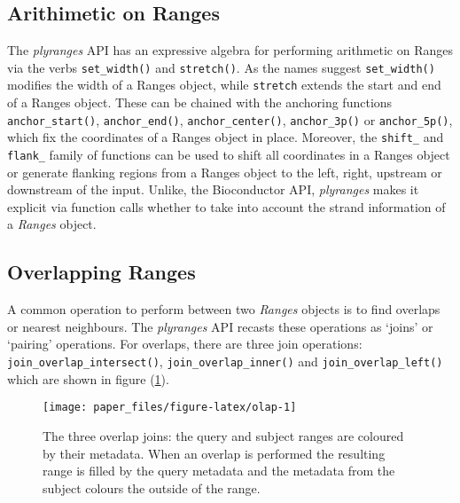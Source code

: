 \documentclass[10pt,letterpaper]{article}
\begin{document}
\subsection{Arithimetic on Ranges}\label{arithimetic-on-ranges}

The \emph{plyranges} API has an expressive algebra for performing
arithmetic on Ranges via the verbs \texttt{set\_width()} and
\texttt{stretch()}. As the names suggest \texttt{set\_width()} modifies
the width of a Ranges object, while \texttt{stretch} extends the start
and end of a Ranges object. These can be chained with the anchoring
functions \texttt{anchor\_start()}, \texttt{anchor\_end()},
\texttt{anchor\_center()}, \texttt{anchor\_3p()} or
\texttt{anchor\_5p()}, which fix the coordinates of a Ranges object in
place. Moreover, the \texttt{shift\_} and \texttt{flank\_} family of
functions can be used to shift all coordinates in a Ranges object or
generate flanking regions from a Ranges object to the left, right,
upstream or downstream of the input. Unlike, the Bioconductor API,
\emph{plyranges} makes it explicit via function calls whether to take
into account the strand information of a \emph{Ranges} object.

\subsection{Overlapping Ranges}\label{overlapping-ranges}

A common operation to perform between two \emph{Ranges} objects is to
find overlaps or nearest neighbours. The \emph{plyranges} API recasts
these operations as `joins' or `pairing' operations. For overlaps, there
are three join operations: \texttt{join\_overlap\_intersect()},
\texttt{join\_overlap\_inner()} and \texttt{join\_overlap\_left()} which
are shown in figure (\ref{fig:olap}).

\begin{figure}

{\centering \texttt{[image: paper\_files/figure-latex/olap-1]} 

}

\caption{The three overlap joins: the query and subject ranges are coloured by their metadata. When an overlap is performed the resulting range is filled by the query metadata and the metadata from the subject colours the outside of the range.}\label{fig:olap}
\end{figure}
\end{document}
